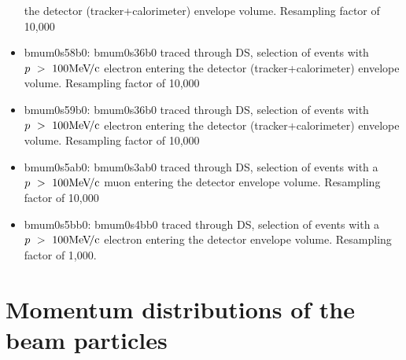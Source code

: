 \documentclass[12pt]{article}
\newcommand {\MeVc}       {\mbox{$\rm MeV\!/c$}}
\begin{document}
\begin{itemize}
  the detector (tracker+calorimeter) envelope volume. Resampling factor of 10,000
\item
  bmum0s58b0: bmum0s36b0 traced through DS, selection of events with $p ~>~ 100 \MeVc$ electron entering
  the detector (tracker+calorimeter) envelope volume. Resampling factor of 10,000
\item
  bmum0s59b0: bmum0s36b0 traced through DS, selection of events with $p ~>~ 100 \MeVc$ electron entering
  the detector (tracker+calorimeter) envelope volume. Resampling factor of 10,000
\item
  bmum0s5ab0: bmum0s3ab0 traced through DS, selection of events with a $p ~>~ 100 \MeVc$ muon
  entering the detector envelope volume. Resampling factor of 10,000
\item
  bmum0s5bb0: bmum0s4bb0 traced through DS, selection of events with a $p ~>~ 100 \MeVc$ electron
  entering the detector envelope volume. Resampling factor of 1,000.
\end{itemize}

\section {Momentum distributions of the beam particles }
\end{document}
